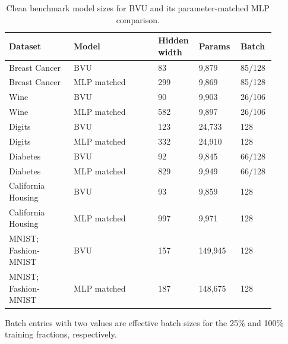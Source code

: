 \begingroup
\small
\setlength{\tabcolsep}{4pt}
\renewcommand{\arraystretch}{1.12}

\begin{table}[t]
\centering
\caption{Clean benchmark model sizes for BVU and its parameter-matched MLP comparison.}
\label{tab:reproducibility_settings}
\begin{tabular}{@{}p{0.23\linewidth}p{0.30\linewidth}p{0.12\linewidth}p{0.14\linewidth}p{0.10\linewidth}@{}}
\toprule
Dataset & Model & Hidden width & Params & Batch \\
\midrule
Breast Cancer & BVU & 83 & 9,879 & 85/128 \\
Breast Cancer & MLP matched & 299 & 9,869 & 85/128 \\
Wine & BVU & 90 & 9,903 & 26/106 \\
Wine & MLP matched & 582 & 9,897 & 26/106 \\
Digits & BVU & 123 & 24,733 & 128 \\
Digits & MLP matched & 332 & 24,910 & 128 \\
Diabetes & BVU & 92 & 9,845 & 66/128 \\
Diabetes & MLP matched & 829 & 9,949 & 66/128 \\
California Housing & BVU & 93 & 9,859 & 128 \\
California Housing & MLP matched & 997 & 9,971 & 128 \\
MNIST; Fashion-MNIST & BVU & 157 & 149,945 & 128 \\
MNIST; Fashion-MNIST & MLP matched & 187 & 148,675 & 128 \\
\bottomrule
\end{tabular}
\parbox{0.98\linewidth}{\footnotesize Batch entries with two values are effective batch sizes for the 25\% and 100\% training fractions, respectively.}
\end{table}

